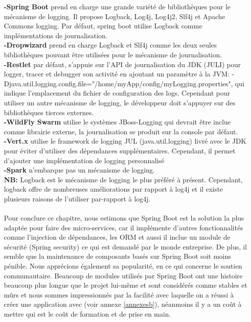\documentclass[12pt, a4paper, openany]{report}
\begin{document}
   \textbf{-Spring Boot} prend en charge une grande variété de bibliothèques pour le mécanisme de logging. Il propose Logback, Log4j, Log4j2, Slf4j et Apache Commons logging. Par défaut, spring boot utilise Logback comme implémentations de journalisation.\\

   \textbf{-Dropwizard} prend en charge Logback et Slf4j comme les deux seules bibliothèques pouvant être utilisées pour le mécanisme de journalisation.\\
   
   \textbf{-Restlet} par défaut, s'appuie sur l'API de journalisation du JDK (JULI) pour logger, tracer et debugger son activité en ajoutant un paramètre à la JVM: -Djava.util.logging.config.file="/home/myApp/config/myLogging.properties", qui indique l'emplacement du fichier de configuration des logs. Cependant pour utiliser un autre mécanisme de logging, le développeur doit s'appuyer sur des bibliothèques tierces externes.\\
   
   \textbf{-WildFly Swarm} utilise le systèmes JBoss-Logging qui devrait être inclue comme librairie externe, la journalisation se produit sur la console par défaut.\\
   
   \textbf{-Vert.x} utilise le framework de logging JUL (java.util.logging) livré avec le JDK pour éviter d'utiliser des dépendances supplémentaires. Cependant, il permet d'ajouter une implémentation de logging personnalisé\\
   
   \textbf{-Spark} n'embarque pas un mécanisme de logging.\\

   \textbf{NB:} Logback est le mécanisme de logging le plus préféré à présent. Cependant, logback offre de nombreuses améliorations par rapport à log4j et il existe plusieurs raisons de l'utiliser par-rapport à log4j.\\ \\
   
   
   Pour conclure ce chapitre, nous estimons que Spring Boot est la solution la plus adaptée pour faire des micro-services, car il implémente d'autres fonctionnalités comme l'injection de dépendances, les ORM et aussi il inclue un module de sécurité (Spring security) ce qui est demandé par le monde entreprise. De plus, il semble que la maintenance de composants basés sur Spring Boot soit moins pénible. Nous apprécions également sa popularité, en ce qui concerne le soutien communautaire. Beaucoup de modules utilisés par Spring Boot ont une histoire beaucoup plus longue que le projet lui-même et sont considérés comme stables et mûrs et nous sommes impressionnés par la facilité avec laquelle on a réussi à créer une application avec (voir annexe \ref{annexesb}), néanmoins il y a un coût à mettre qui est le coût de formation et de prise en main.\\
   
\end{document}
